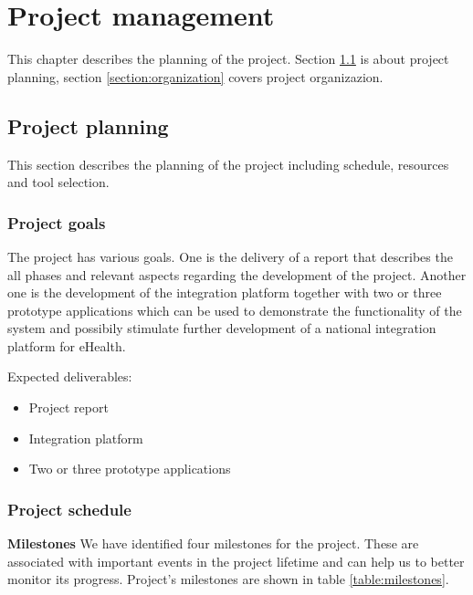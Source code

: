 \chapter{Project management}

\label{ch:management}


\nocite{Sommerville9}


This chapter describes the planning of the project. Section \ref{section:planning} is about project planning,
section \ref{section:organization} covers project organizazion.

\section{Project planning}
\label{section:planning}
This section describes the planning of the project including schedule, resources and tool selection.

\subsection{Project goals}
The project has various goals. One is the delivery of a report that describes the all phases and relevant aspects regarding the development of the project. Another one is the development of the integration platform together with two or three prototype applications which can be used to demonstrate the functionality of the system and possibily stimulate further development of a national integration platform for eHealth.

Expected deliverables:

\begin{itemize}
\item Project report
\item Integration platform
\item Two or three prototype applications
\end{itemize}



\subsection{Project schedule}

\textbf{Milestones} \newline
We have identified four milestones for the project. These are associated with important events in the project lifetime and can help us to better monitor its progress. Project's milestones are shown in table \ref{table:milestones}.

